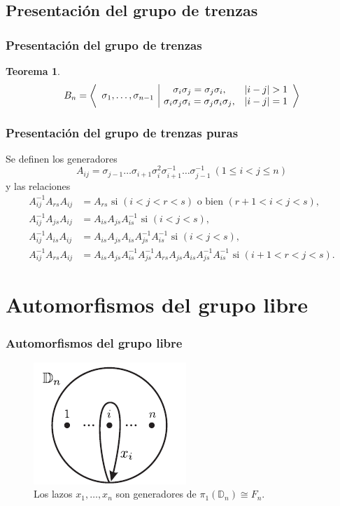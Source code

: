 \documentclass{beamer}
\theoremstyle{definition}
\newtheorem{teorema}{Teorema}
\newcommand{\D}{\mathbb{D}}
\begin{document}
\subsection{Presentación del grupo de trenzas}



\begin{frame}
\frametitle{Presentación del grupo de trenzas}
\begin{teorema}
\[
B_n=\left\langle\begin{array}{c| c c}
\multirow{2}{*}{$\sigma_1,\dots,\sigma_{n-1}$} & \sigma_i\sigma_j=\sigma_j\sigma_i, & |i-j|>1\\
& \sigma_i\sigma_j\sigma_i=\sigma_j\sigma_i\sigma_j, & |i-j|=1
\end{array}\right\rangle
\]
\end{teorema}
\end{frame}

\begin{frame}
\frametitle{Presentación del grupo de trenzas puras}
Se definen los generadores 
\[
A_{ij}=\sigma_{j-1}\dots\sigma_{i+1}\sigma_i^2\sigma_{i+1}^{-1}\dots\sigma_{j-1}^{-1}\ (1\leq i<j\leq n)
\]
y las relaciones
\begin{align*}
A_{ij}^{-1}A_{rs}A_{ij}&=A_{rs}\text{ si } (i<j<r<s)\text{ o bien } (r+1<i<j<s),\\
A_{ij}^{-1}A_{js}A_{ij}&=A_{is}A_{js}A_{is}^{-1} \text{ si } (i<j<s),\\
A_{ij}^{-1}A_{is}A_{ij}&=A_{is}A_{js}A_{is}A_{js}^{-1}A_{is}^{-1}\text{ si } (i<j<s),\\
A_{ij}^{-1}A_{rs}A_{ij}&=A_{is}A_{js}A_{is}^{-1}A_{js}^{-1}A_{rs}A_{js}A_{is}A_{js}^{-1}A_{is}^{-1}\text{ si } (i+1<r<j<s).
\end{align*}
\end{frame}

\section{Automorfismos del grupo libre}
\begin{frame}
\frametitle{Automorfismos del grupo libre}

\begin{figure}[h!]
\includegraphics[scale=0.7]{Imagenes/Disco.png}
\caption{Los lazos $x_1,\dots,x_n$ son generadores de $\pi_1(\D_n)\cong F_n$.}
\end{figure}
\end{frame}
\end{document}
